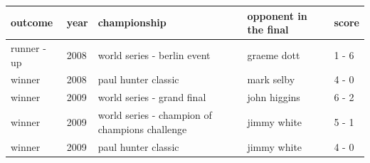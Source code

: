 \documentclass{article}
\begin{document}
\begin{tabular}{lllll}
\toprule
outcome & year & championship & opponent in the final & score \\
\midrule
runner - up & 2008 & world series - berlin event & graeme dott & 1 - 6 \\
winner & 2008 & paul hunter classic & mark selby & 4 - 0 \\
winner & 2009 & world series - grand final & john higgins & 6 - 2 \\
winner & 2009 & world series - champion of champions challenge & jimmy white & 5 - 1 \\
winner & 2009 & paul hunter classic & jimmy white & 4 - 0 \\
\bottomrule
\end{tabular}
\end{document}

